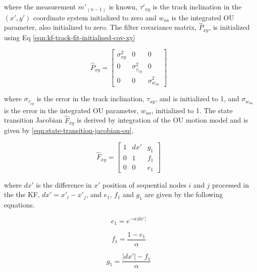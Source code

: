 where the measurement $m'_{(n-1)}$ is known, $\tau'_{xy}$ is the track inclination in the $(x', y')$ coordinate system initialized to zero and $w_{ou}$ is the integrated OU parameter, also initialized to zero. The filter covariance matrix, $\hat{P}_{xy}$, is initialized using Eq \eqref{eqn:kf-track-fit-initialised-cov-xy}

\begin{equation}
\hat{P}_{xy} = \begin{bmatrix} \sigma_{xy}^2 & 0 & 0 
                            \\ 0 & \sigma_{\tau^{'}_{xy}}^2 & 0 
                            \\ 0 & 0 & \sigma_{w_{ou}}^2 \end{bmatrix} 
\label{eqn:kf-track-fit-initialised-cov-xy}
\end{equation}

where $\sigma_{\tau^{'}_{xy}}$ is the error in the track inclination, $\tau_{xy}$, and is initialized to 1, and $\sigma_{w_{ou}}$ is the error in the integrated OU parameter, $w_{ou}$, initialized to 1. The state transition Jacobian $\hat{F}_{xy}$ is derived by integration of the OU motion model \cite{OU} and is given by \eqref{eqn:state-transition-jacobian-ou},

\begin{equation}
\hat{F}_{xy} = \begin{bmatrix} 1 & dx' & g_1 \\ 0 & 1 & f_1 \\ 0 & 0 & e_1 \end{bmatrix} 
\label{eqn:state-transition-jacobian-ou}
\end{equation}

where $dx'$ is the difference in $x'$ position of sequential nodes $i$ and $j$ processed in the the KF, $dx' = x'_i - x'_j$, and $e_1$, $f_1$ and $g_1$ are given by the following equations. 

\begin{equation}
e_1 = e^{- \alpha \lvert dx' \rvert}
\label{eqn:e1}
\end{equation}

\begin{equation}
f_1 = \frac{1 - e_1}{\alpha}
\label{eqn:f1}
\end{equation}

\begin{equation}
g_1 = \frac{\lvert dx' \rvert - f_1}{\alpha}
\label{eqn:g1}
\end{equation}

